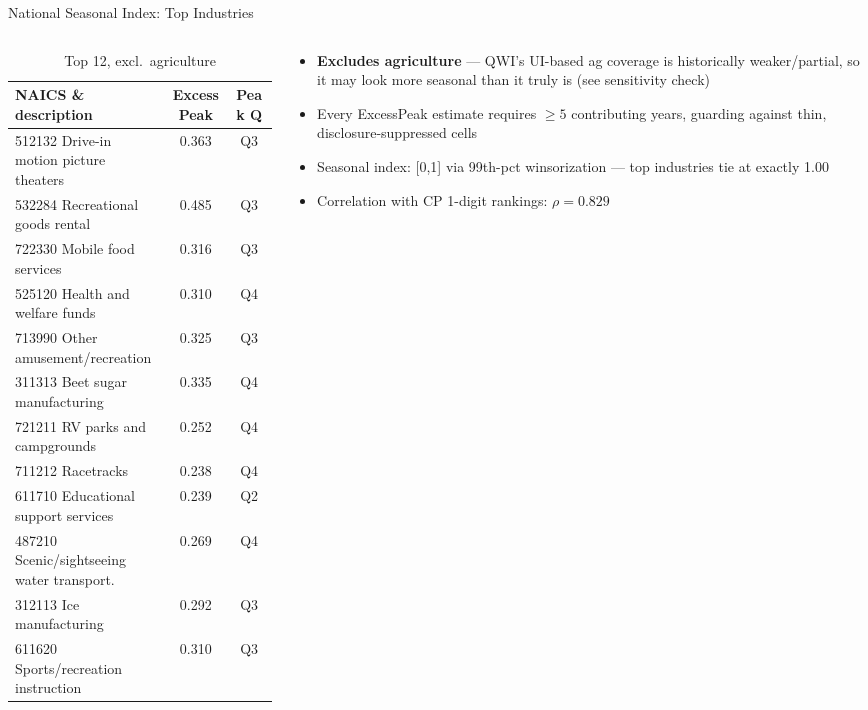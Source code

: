 \documentclass[aspectratio=169]{beamer}
\begin{document}
\begin{frame}{National Seasonal Index: Top Industries}
  \begin{columns}
    \begin{column}{0.55\textwidth}
      \begin{table}
        \scriptsize
        \setlength{\tabcolsep}{4pt}
        \renewcommand{\arraystretch}{0.85}
        \caption{Top 12, excl.\ agriculture}
        \begin{tabular}{lcc}
          \toprule
          NAICS \& description & ExcessPeak & Peak Q \\
          \midrule
          512132 Drive-in motion picture theaters & 0.363 & Q3 \\
          532284 Recreational goods rental     & 0.485 & Q3 \\
          722330 Mobile food services        & 0.316 & Q3 \\
          525120 Health and welfare funds    & 0.310 & Q4 \\
          713990 Other amusement/recreation  & 0.325 & Q3 \\
          311313 Beet sugar manufacturing    & 0.335 & Q4 \\
          721211 RV parks and campgrounds    & 0.252 & Q4 \\
          711212 Racetracks                  & 0.238 & Q4 \\
          611710 Educational support services & 0.239 & Q2 \\
          487210 Scenic/sightseeing water transport.\ & 0.269 & Q4 \\
          312113 Ice manufacturing            & 0.292 & Q3 \\
          611620 Sports/recreation instruction & 0.310 & Q3 \\
          \bottomrule
        \end{tabular}
      \end{table}
    \end{column}
    \begin{column}{0.42\textwidth}
      \small
      \begin{itemize}
        \item \textbf{Excludes agriculture} --- QWI's UI-based ag coverage
              is historically weaker/partial, so it may look more seasonal
              than it truly is (see sensitivity check)
        \item Every ExcessPeak estimate requires $\geq 5$ contributing
              years, guarding against thin, disclosure-suppressed cells
        \item Seasonal index: [0,1] via 99th-pct winsorization --- top
              industries tie at exactly 1.00
        \item Correlation with CP 1-digit rankings: $\rho = 0.829$
      \end{itemize}
    \end{column}
  \end{columns}
\end{frame}
\end{document}
